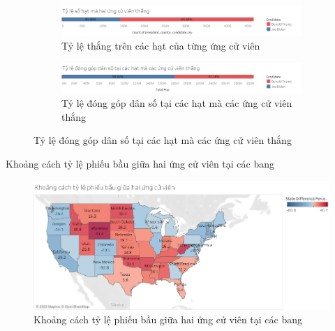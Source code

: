 \documentclass[10pt]{beamer}
\theoremstyle{remark}
\theoremstyle{definition}
\begin{document}
\begin{frame}
	\begin{figure}[h!]
        \begin{subfigure}[b]{\textwidth}
            \includegraphics[width=0.9\linewidth]{County_Total_Percentage_Candidate_Win.png}
            \caption{Tỷ lệ thắng trên các hạt của từng ứng cử viên}
        \end{subfigure}
        \vfill
        \begin{subfigure}[b]{\textwidth}
            \includegraphics[width=0.9\linewidth]{County_Percentage_Population_Candidate.png}
            \caption{Tỷ lệ đóng góp dân số tại các hạt mà các ứng cử viên thắng}
        \end{subfigure}
    \end{figure}
\end{frame}

\begin{frame}{Khoảng cách tỷ lệ phiếu bầu giữa hai ứng cử viên tại các bang}
	\begin{figure}[h!]
        \centering
        \includegraphics[width=\textwidth]{figures/State_Difference_Percentage_Total_Vote_Two_Candidate.png}
        \caption{Khoảng cách tỷ lệ phiếu bầu giữa hai ứng cử viên tại các bang}
    \end{figure}
\end{frame}
\end{document}
